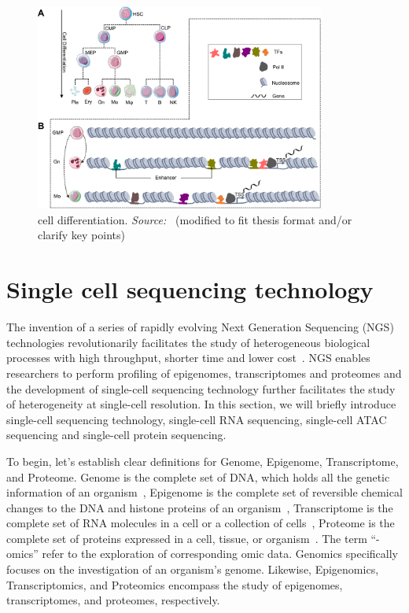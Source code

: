 \begin{figure}[!ht]
	\centering
	\includegraphics[width=0.85\textwidth]{cell_differentiation/fig}
	\vspace{0.1cm}
	\caption[cell differentiation]{cell differentiation. \emph{Source:~\cite{costa2023dissecting}} (modified to fit thesis format and/or clarify key points)}
	\label{fig:piechart-mulitmodal-methods}
\end{figure}


\section{Single cell sequencing technology}
\label{background:profiling_singlecell}
The invention of a series of rapidly evolving Next Generation Sequencing (NGS) technologies revolutionarily facilitates the study of heterogeneous biological processes with high throughput, shorter time and lower cost~\citep{svensson2018exponential}. NGS enables researchers to perform profiling of epigenomes, transcriptomes and proteomes and the development of single-cell sequencing technology further facilitates the study of heterogeneity at single-cell resolution. In this section, we will briefly introduce single-cell sequencing technology, single-cell RNA sequencing, single-cell ATAC sequencing and single-cell protein sequencing.

To begin, let's establish clear definitions for Genome, Epigenome, Transcriptome, and Proteome. Genome is the complete set of DNA, which holds all the genetic information of an organism~\citep{hubbard2002genome}, Epigenome is the complete set of reversible chemical changes to the DNA and histone proteins of an organism~\citep{bernstein2007epigenome}, Transcriptome is the complete set of RNA molecules in a cell or a collection of cells~\citep{haoudi2006proteome}, Proteome is the complete set of proteins expressed in a cell, tissue, or organism~\citep{wang2009transcriptome}. The term “-omics” refer to the exploration of corresponding omic data. Genomics specifically focuses on the investigation of an organism's genome.  Likewise, Epigenomics, Transcriptomics, and Proteomics encompass the study of epigenomes, transcriptomes, and proteomes, respectively.


